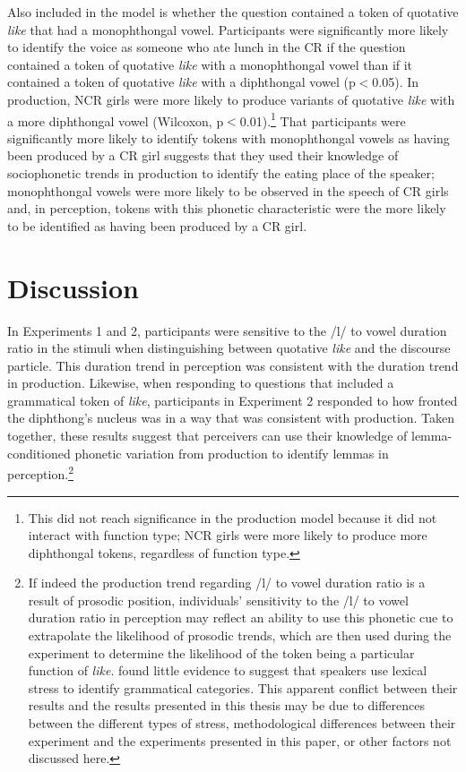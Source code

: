 Also included in the model is whether the question contained a token of quotative \textit{like} that had a monophthongal vowel.  Participants were significantly more likely to identify the voice as someone who ate lunch in the CR if the question contained a token of quotative \textit{like} with a monophthongal vowel than if it contained a token of quotative \textit{like} with a diphthongal vowel (p$<$0.05).  In production, NCR girls were more likely to produce variants of quotative \textit{like} with a more diphthongal vowel (Wilcoxon, p$<$0.01).\footnote{This did not reach significance in the production model because it did not interact with function type; NCR girls were more likely to produce more diphthongal tokens, regardless of function type.}  That participants were significantly more likely to identify tokens with monophthongal vowels as having been produced by a CR girl suggests that they used their knowledge of sociophonetic trends in production to identify the eating place of the speaker; monophthongal vowels were more likely to be observed in the speech of CR girls and, in perception, tokens with this phonetic characteristic were the more likely to be identified as having been produced by a CR girl.  

\section{Discussion}

In Experiments 1 and 2, participants were sensitive to the /l/ to vowel duration ratio in the stimuli when distinguishing between quotative \textit{like} and the discourse particle.  This duration trend in perception was consistent with the duration trend in production.  Likewise, when responding to questions that included a grammatical token of \textit{like}, participants in Experiment 2 responded to how fronted the diphthong's nucleus was in a way that was consistent with production.  Taken together, these results suggest that perceivers can use their knowledge of lemma-conditioned phonetic variation from production to identify lemmas in perception.\footnote{If indeed the production trend regarding /l/ to vowel duration ratio is a result of prosodic position, individuals' sensitivity to the /l/ to vowel duration ratio in perception may reflect an ability to use this phonetic cue to extrapolate the likelihood of prosodic trends, which are then used during the experiment to determine the likelihood of the token being a particular function of \textit{like}.   found little evidence to suggest that speakers use lexical stress to identify grammatical categories.  This apparent conflict between their results and the results presented in this thesis may be due to differences between the different types of stress, methodological differences between their experiment and the experiments presented in this paper, or other factors not discussed here.}

